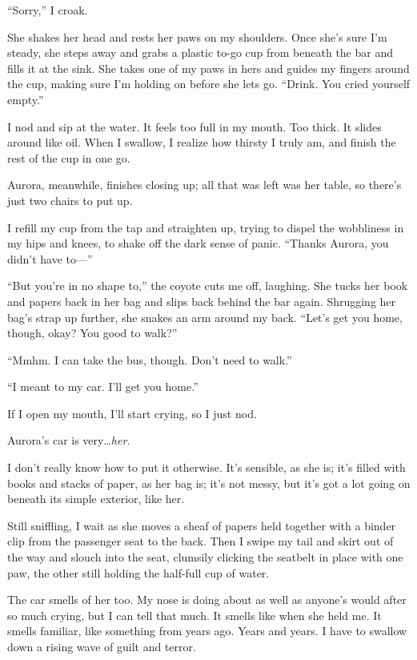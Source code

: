 ``Sorry,'' I croak.

She shakes her head and rests her paws on my shoulders. Once she's sure I'm steady, she steps away and grabs a plastic to-go cup from beneath the bar and fills it at the sink. She takes one of my paws in hers and guides my fingers around the cup, making sure I'm holding on before she lets go. ``Drink. You cried yourself empty.''

I nod and sip at the water. It feels too full in my mouth. Too thick. It slides around like oil. When I swallow, I realize how thirsty I truly am, and finish the rest of the cup in one go.

Aurora, meanwhile, finishes closing up; all that was left was her table, so there's just two chairs to put up.

I refill my cup from the tap and straighten up, trying to dispel the wobbliness in my hips and knees, to shake off the dark sense of panic. ``Thanks Aurora, you didn't have to---''

``But you're in no shape to,'' the coyote cuts me off, laughing. She tucks her book and papers back in her bag and slips back behind the bar again. Shrugging her bag's strap up further, she snakes an arm around my back. ``Let's get you home, though, okay? You good to walk?''

``Mmhm. I can take the bus, though. Don't need to walk.''

``I meant to my car. I'll get you home.''

If I open my mouth, I'll start crying, so I just nod.

\secdiv{}

\noindent Aurora's car is very\ldots{}\emph{her.}

I don't really know how to put it otherwise. It's sensible, as she is; it's filled with books and stacks of paper, as her bag is; it's not messy, but it's got a lot going on beneath its simple exterior, like her.

Still sniffling, I wait as she moves a sheaf of papers held together with a binder clip from the passenger seat to the back. Then I swipe my tail and skirt out of the way and slouch into the seat, clumsily clicking the seatbelt in place with one paw, the other still holding the half-full cup of water.

The car smells of her too. My nose is doing about as well as anyone's would after so much crying, but I can tell that much. It smells like when she held me. It smells familiar, like something from years ago. Years and years. I have to swallow down a rising wave of guilt and terror.

